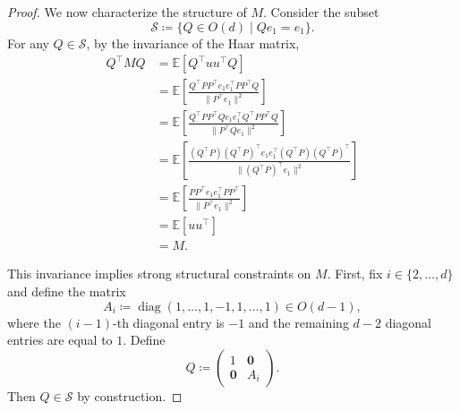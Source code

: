 \documentclass[10pt,a4paper]{amsart}
\DeclareMathOperator{\diag}{diag}
\begin{document}
\begin{proof}
We now characterize the structure of $M$.
Consider the subset
\[
\mathcal{S} \coloneqq \{Q \in O(d) \mid Q e_1 = e_1\}.
\]
For any $Q \in \mathcal{S}$, by the invariance of the Haar matrix,
\begin{align*}
Q^\top M Q
&= \mathbb{E}[Q^\top uu^\top Q] \\
&= \mathbb{E}\!\left[\frac{Q^\top PP^\top e_1 e_1^\top PP^\top Q}{\|P^\top e_1\|^2}\right] \\
&= \mathbb{E}\!\left[\frac{Q^\top PP^\top Q e_1 e_1^\top Q^\top PP^\top Q}{\|P^\top Q e_1\|^2}\right] \\
&= \mathbb{E}\!\left[\frac{(Q^\top P)(Q^\top P)^\top e_1 e_1^\top (Q^\top P)(Q^\top P)^\top}{\|(Q^\top P)^\top e_1\|^2}\right] \\
&= \mathbb{E}\!\left[\frac{P P^\top e_1 e_1^\top PP^\top}{\|P^\top e_1\|^2}\right] \\
&= \mathbb{E}[uu^\top] \\
&= M.
\end{align*}

This invariance implies strong structural constraints on $M$.
First, fix $i \in \{2,\dots,d\}$ and define the matrix
\[
A_i \coloneqq \diag(1,\dots,1,-1,1,\dots,1) \in O(d-1),
\]
where the $(i-1)$-th diagonal entry is $-1$ and the remaining $d-2$ diagonal
entries are equal to $1$.
Define
\[
Q \coloneqq
\begin{pmatrix}
1 & \mathbf{0} \\
\mathbf{0} & A_i
\end{pmatrix}.
\]
Then $Q \in \mathcal{S}$ by construction.


\end{proof}
\end{document}
